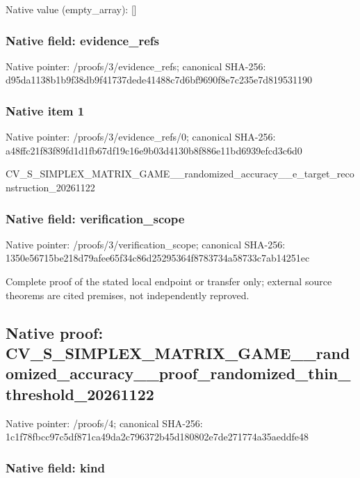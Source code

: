 \documentclass[10pt,a4paper]{article}
\begin{document}
Native value (empty\_array): []



\subsubsection{Native field: evidence\_refs}


Native pointer: /proofs/3/evidence\_refs; canonical SHA-256: d95da1138b1b9f38db9f4173\allowbreak{}7dede41488c7d6bf9690f8e7\allowbreak{}c235e7d819531190



\subsubsection{Native item 1}


Native pointer: /proofs/3/evidence\_refs/0; canonical SHA-256: a48ffc21f83f89fd1d1fb67d\allowbreak{}f19c16e9b03d4130b8f886e1\allowbreak{}1bd6939efcd3c6d0


CV\_S\_SIMPLEX\_MATRIX\_GAME\allowbreak{}\_\_randomized\_accuracy\_\_e\allowbreak{}\_target\_reconstruction\_2\allowbreak{}0261122


\subsubsection{Native field: verification\_scope}


Native pointer: /proofs/3/verification\_scope; canonical SHA-256: 1350e56715be218d79afee65\allowbreak{}f34c86d25295364f8783734a\allowbreak{}58733c7ab14251ec


Complete proof of the stated local endpoint or transfer only; external source theorems are cited premises, not independently reproved.


\subsection{Native proof: CV\_S\_SIMPLEX\_MATRIX\_GAME\allowbreak{}\_\_randomized\_accuracy\_\_p\allowbreak{}roof\_randomized\_thin\_thr\allowbreak{}eshold\_20261122}


Native pointer: /proofs/4; canonical SHA-256: 1c1f78fbcc97c5df871ca49d\allowbreak{}a2c796372b45d180802e7de2\allowbreak{}71774a35aeddfe48



\subsubsection{Native field: kind}
\end{document}
